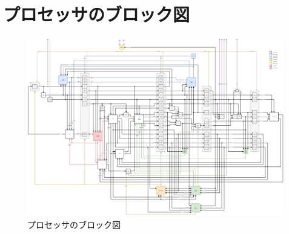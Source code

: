 \documentclass[../main.tex]{subfiles}
\begin{document}
  \onecolumn

  \clearpage
  \section{プロセッサのブロック図} \label{appendix:block-diagram}
  \begin{figure}[h!]
    \centering
    \includegraphics[angle=90, origin=c, totalheight=0.9\textheight]{images/block_diagram.png}
    \caption{プロセッサのブロック図}
    \label{fig:block-diagram}
  \end{figure}

  \clearpage
\end{document}
